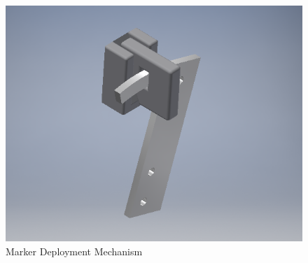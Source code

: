 \documentclass{article}
\begin{document}
\begin{figure}
    \centering
    \includegraphics[width= 0.5 \textwidth]{29_03-18/images/marker.png}
    \caption{Marker Deployment Mechanism}
    \label{fig:dropper}
\end{figure}
\end{document}
